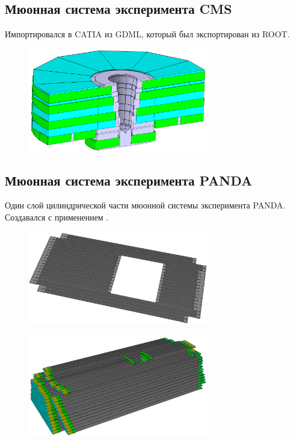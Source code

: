\subsection{Мюонная система эксперимента CMS}\label{sec:secCmsMuon}

Импортировался в CATIA из GDML, который был экспортирован из ROOT.

\begin{figure}[H]
\centering
\includegraphics[width=0.7\textwidth]{pictures/CMS_MUON.png}
\caption{}
\label{fig:CmsMuon}
\end{figure}


\subsection{Мюонная система эксперимента PANDA}\label{sec:secPandaMuon}

Один слой цилиндрической части мюонной системы эксперимента PANDA.
Создавался с применением .

\begin{figure}[H]
\centering
\includegraphics[width=0.7\textwidth]{pictures/PANDA_layer.png}
\caption{}
\label{fig:PandaMuonLayer}
\end{figure}

\begin{figure}[H]
\centering
\includegraphics[width=0.7\textwidth]{pictures/PANDA_MUCH_part.png}
\caption{}
\label{fig:PandaMuonPart}
\end{figure}

